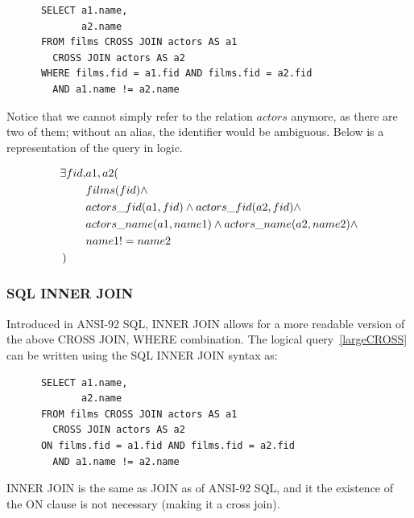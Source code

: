\documentclass[a4paper, 11pt]{article}
\begin{document}
      \begin{verbatim}
      SELECT a1.name,
             a2.name
      FROM films CROSS JOIN actors AS a1
        CROSS JOIN actors AS a2
      WHERE films.fid = a1.fid AND films.fid = a2.fid 
        AND a1.name != a2.name
      \end{verbatim}

      Notice that we cannot simply refer to the relation $actors$ anymore, as
      there are two of them; without an alias, the identifier would be
      ambiguous. Below is a representation of the query in logic.

      \begin{align}
          \exists fid, & a1, a2(  \nonumber\\
                       & films(fid) \land \nonumber\\
                       & actors\_fid(a1, fid) \land actors\_fid(a2, fid) \land \nonumber\\
                       & actors\_name(a1, name1) \land actors\_name(a2, name2) \land \nonumber\\
                       & name1 != name2 \nonumber\\
        ) \hspace{6mm} &  %
        \label{largeCROSS}
      \end{align}


    \subsubsection{SQL INNER JOIN}

      Introduced in ANSI-92 SQL, INNER JOIN allows for a more readable version of
      the above CROSS JOIN, WHERE combination. The logical query~\ref{largeCROSS}
      can be written using the SQL INNER JOIN syntax as:

      \begin{verbatim}
      SELECT a1.name,
             a2.name
      FROM films CROSS JOIN actors AS a1
        CROSS JOIN actors AS a2
      ON films.fid = a1.fid AND films.fid = a2.fid 
        AND a1.name != a2.name
      \end{verbatim}

      INNER JOIN is the same as JOIN as of ANSI-92 SQL, and it the existence of
      the ON clause is not necessary (making it a cross join).
\end{document}
